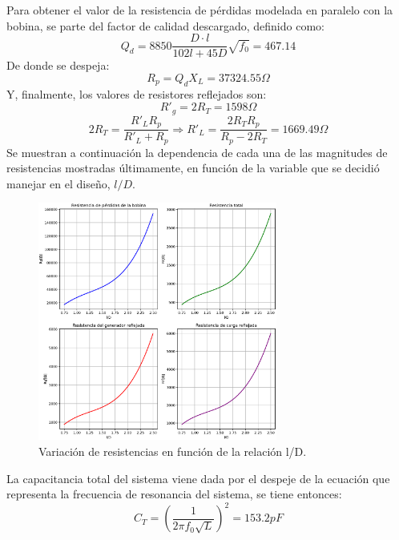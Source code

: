 \documentclass{article}
\begin{document}
\noindent Para obtener el valor de la resistencia de pérdidas modelada en paralelo con la bobina, se parte del factor de calidad descargado, definido como:
\begin{equation*}
    Q_d = 8850 \frac{D \cdot l}{102l + 45D} \sqrt{f_0} = 467.14
\end{equation*}
\noindent De donde se despeja:
\begin{equation*}
    R_p = Q_d X_L = 37324.55 \Omega
\end{equation*}
\noindent Y, finalmente, los valores de resistores reflejados son:
\begin{equation*}
    R'_g = 2R_T = 1598 \Omega
\end{equation*}
\begin{equation*}
    2R_T = \frac{R'_L R_p}{R'_L + R_p} \Rightarrow R'_L = \frac{2R_T R_p}{R_p - 2R_T} = 1669.49 \Omega
\end{equation*}
\noindent Se muestran a continuación la dependencia de cada una de las magnitudes de resistencias mostradas últimamente, en función de la variable que se decidió manejar en el diseño, $l/D$.
\begin{figure}[H]
\centering
\includegraphics[width=0.7\textwidth]{./img/figura12.eps}
\caption{Variación de resistencias en función de la relación l/D.}
\label{fig:circuito12}
\end{figure}
\noindent La capacitancia total del sistema viene dada por el despeje de la ecuación que representa la frecuencia de resonancia del sistema, se tiene entonces:
\begin{equation*}
    C_T = \left( \frac{1}{2\pi f_0 \sqrt{L}} \right)^2 = 153.2 pF
\end{equation*}
\end{document}
